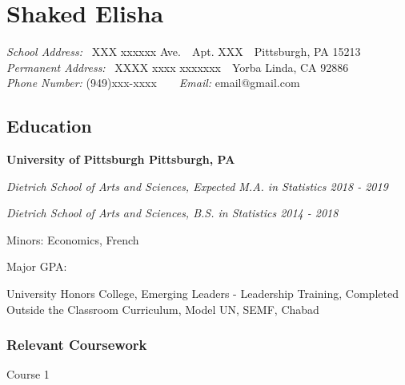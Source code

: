 \documentclass[10pt,letterpaper]{article}
\begin{document}
\section*{Shaked Elisha}
\begin{center}
	{\emph{School Address:} \ XXX xxxxxx Ave.\ \textbar\ Apt. XXX\ \textbar\ Pittsburgh, PA 15213}\\
	{\emph{Permanent Address:} \ XXXX xxxx xxxxxxx\ \textbar\ Yorba Linda, CA 92886}\\
	{\emph{Phone Number:} (949)xxx-xxxx\ \ \textbar\ \ \emph{Email:} email@gmail.com}
\end{center}

\subsection*{Education}
\begin{rlist}
	\item \textbf{University of Pittsburgh \hfill Pittsburgh, PA}
	\item \textit{Dietrich School of Arts and Sciences, Expected M.A. in Statistics \hfill 2018 - 2019}
	\item \textit{Dietrich School of Arts and Sciences, B.S. in Statistics \hfill 2014 - 2018}
	\begin{rlist}
		\item Minors: Economics, French
		\item Major GPA: %
		\item University Honors College, Emerging Leaders - Leadership Training, Completed Outside the Classroom Curriculum, Model UN, SEMF, Chabad
	\end{rlist}
\end{rlist}
\subsubsection*{Relevant Coursework}
\begin{rlist}
	\item Course 1
\end{rlist}
\end{document}

